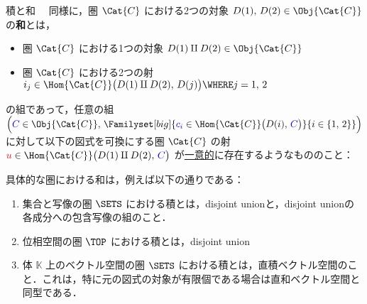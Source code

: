 \documentclass[TQFT_main]{subfiles}
\begin{document}
\begin{myexample}[label=def:product-coproduct]{積と和}
    　同様に，圏 $\Cat{C}$ における2つの対象 $D(1),\, D(2) \in \Obj{\Cat{C}}$ の\textbf{和}とは，
    \begin{itemize}
        \item 圏 $\Cat{C}$ における1つの対象 $D(1) \amalg D(2) \in \Obj{\Cat{C}}$
        \item 圏 $\Cat{C}$ における2つの射 $i_j \in \Hom{\Cat{C}} \bigl( D(1) \amalg D(2),\, D(j) \bigr) \WHERE j=1,\, 2$
    \end{itemize}
    の組であって，任意の組 $\Bigl( \textcolor{blue}{C} \in \Obj{\Cat{C}},\, \Familyset[big]{\textcolor{blue}{c_i} \in \Hom{\Cat{C}} \bigl( D(i),\, \textcolor{blue}{C} \bigr)}{i \in \{1,\, 2\}} \Bigr)$ に対して以下の図式を可換にする圏 $\Cat{C}$ の射 $\textcolor{red}{u} \in \Hom{\Cat{C}} \bigl(D(1)\amalg D(2),\, \textcolor{blue}{C} \bigr)$ が\underline{一意的}に存在するようなもののこと：
    \begin{center}
    \end{center}
    具体的な圏における和は，例えば以下の通りである：
    \begin{enumerate}
        \item 集合と写像の圏 $\SETS$ における積とは，disjoint unionと，disjoint unionの各成分への包含写像の組のこと．
        \item 位相空間の圏 $\TOP$ における積とは，disjoint union
        \item 体 $\mathbb{K}$ 上のベクトル空間の圏 $\SETS$ における積とは，直積ベクトル空間のこと．これは，特に元の図式の対象が有限個である場合は直和ベクトル空間と同型である．
    \end{enumerate}
\end{myexample}
\end{document}
